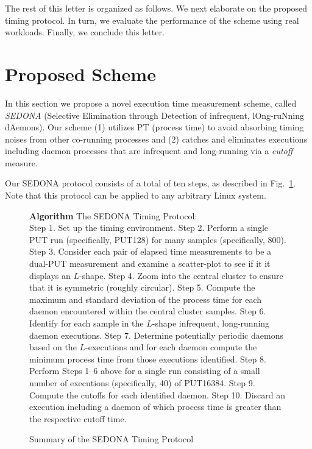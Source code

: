 \documentclass[letter]{ieice}
\begin{document}
\noindent
The rest of this letter is organized as follows. 
{\color{blue}We next elaborate on the proposed timing protocol. 
In turn, we evaluate the performance of the scheme using real workloads. 
Finally, we conclude this letter.}


\section{Proposed Scheme}
\label{sec:prop_appach}

In this section we propose a novel execution time measurement scheme, 
called {\em SEDONA} (Selective Elimination through Detection of infrequent, lOng-ruNning dAemons). {\color{blue} Our scheme (1) utilizes PT (process time) to avoid absorbing timing noises from other co-running processes and (2) catches and eliminates executions including daemon processes that are infrequent and \hbox{long-running} via a {\em cutoff} measure. 
}

Our SEDONA protocol consists of a total of ten steps, as described in Fig.~\ref{alg:find}. 
{\color{red}Note that this protocol can be applied to any arbitrary Linux system.}

\begin{figure}[h]
\begin{center}
\begin{algorithmic}
{\bf Algorithm} The SEDONA Timing Protocol: \\
\STATE Step 1. Set up the timing environment.
\STATE Step 2. Perform a single PUT run (specifically, PUT128) for many samples (specifically, 800).
\STATE Step 3. Consider each pair of elapsed time measurements to be a dual-PUT measurement 
and examine a scatter-plot to see if it it displays an $L$-shape.
\STATE Step 4. Zoom into the central cluster to ensure that it is symmetric (roughly circular).
\STATE Step 5. Compute the maximum and standard deviation of the process time 
for each daemon encountered within the central cluster samples.
\STATE Step 6. Identify for each sample in the $L$-shape infrequent, long-running daemon executions. 
\STATE Step 7. Determine potentially periodic daemons based on the $L$-executions 
and for each daemon compute the minimum process time from those executions identified. 
\STATE Step 8. Perform Steps 1--6 above for a single run 
consisting of a small number of executions (specifically, 40) of PUT16384.  
\STATE Step 9. Compute the cutoffs for each identified daemon. 
\STATE Step 10. Discard an execution including a daemon of which process time is greater than the respective cutoff time.
\end{algorithmic}
\end{center}
\caption{Summary of the SEDONA Timing Protocol\label{alg:find}}
\vspace{-0.25in}
\end{figure}
\end{document}
